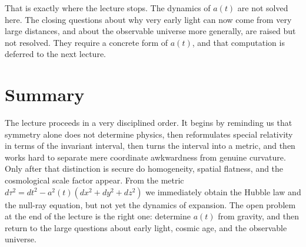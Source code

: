 That is exactly where the lecture stops. The dynamics of \(a(t)\) are not solved here. The closing questions about why very early light can now come from very large distances, and about the observable universe more generally, are raised but not resolved. They require a concrete form of \(a(t)\), and that computation is deferred to the next lecture.

\section{Summary}

The lecture proceeds in a very disciplined order. It begins by reminding us that symmetry alone does not determine physics, then reformulates special relativity in terms of the invariant interval, then turns the interval into a metric, and then works hard to separate mere coordinate awkwardness from genuine curvature. Only after that distinction is secure do homogeneity, spatial flatness, and the cosmological scale factor appear. From the metric \(d\tau^2 = dt^2-a^2(t)(dx^2+dy^2+dz^2)\) we immediately obtain the Hubble law and the null-ray equation, but not yet the dynamics of expansion. The open problem at the end of the lecture is the right one: determine \(a(t)\) from gravity, and then return to the large questions about early light, cosmic age, and the observable universe.